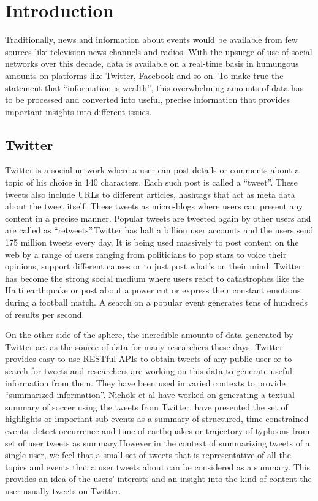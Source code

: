 \chapter{Introduction}
\label{chap-one}

Traditionally, news and information about events would be available from few sources like television news channels and radios. With the upsurge of use of social networks over this decade, data is available on a real-time basis in humungous amounts on platforms like Twitter, Facebook and so on. To make true the statement that “information is wealth”, this overwhelming amounts of data has to be processed and converted into useful, precise information that provides important insights into different issues.

\section{Twitter}
Twitter is a social network where a user can post details or comments about a topic of his choice in 140 characters. Each such post is called a “tweet”. These tweets also include URLs to different articles, hashtags that act as meta data about the tweet itself.  These tweets as micro-blogs where users can present any content in a precise manner. Popular tweets are tweeted again by other users and are called as “retweets”.Twitter has half a billion user accounts and the users send 175 million tweets every day. It is being used massively to post content on the web by a range of users ranging from politicians to pop stars to voice their opinions, support different causes or to just post what’s on their mind. Twitter has become the strong social medium where users react to catastrophes like the Haiti earthquake or post about a power cut or express their constant emotions during a football match. A search on a popular event generates tens of hundreds of results per second. 

On the other side of the sphere, the incredible amounts of data generated by Twitter act as the source of data for many researchers these days. Twitter provides easy-to-use RESTful APIs to obtain tweets of any public user or to search for tweets and researchers are working on this data to generate useful information from them. They have been used in varied contexts to provide “summarized information”. Nichols et al have worked on generating a textual summary of soccer using the tweets from Twitter.\citet{DBLP:conf/icwsm/ChakrabartiP11} have presented the set of highlights or important sub events as a summary of structured, time-constrained events. \citet{Sakaki:2010:EST:1772690.1772777} detect occurrence and time of earthquakes or trajectory of typhoons from set of user tweets as summary.However in the context of summarizing tweets of a single user, we feel that a small set of tweets that is representative of all the topics and events that a user tweets about can be considered as a summary. This  provides an idea of the users’ interests and an insight into the kind of content the user usually tweets on Twitter.
